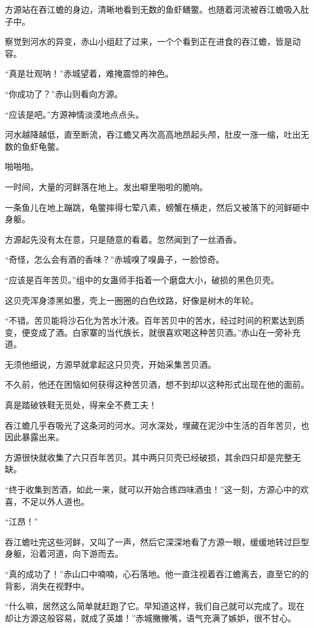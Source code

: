 \begin{this_body}
方源站在吞江蟾的身边，清晰地看到无数的鱼虾鳝鳖。也随着河流被吞江蟾吸入肚子中。

察觉到河水的异变，赤山小组赶了过来，一个个看到正在进食的吞江蟾，皆是动容。

“真是壮观呐！”赤城望着，难掩震惊的神色。

“你成功了？”赤山则看向方源。

“应该是吧。”方源神情淡漠地点点头。

河水越降越低，直至断流，吞江蟾又再次高高地昂起头颅，肚皮一涨一缩，吐出无数的鱼虾龟鳖。

啪啪啪。

一时间，大量的河鲜落在地上。发出噼里啪啦的脆响。

一条鱼儿在地上蹦跳，龟鳖摔得七荤八素，螃蟹在横走，然后又被落下的河鲜砸中身躯。

方源起先没有太在意，只是随意的看着。忽然闻到了一丝酒香。

“奇怪，怎么会有酒的香味？”赤城嗅了嗅鼻子，一脸惊奇。

“应该是百年苦贝。”组中的女蛊师手指着一个磨盘大小，破损的黑色贝壳。

这贝壳浑身漆黑如墨，壳上一圈圈的白色纹路，好像是树木的年轮。

“不错。苦贝能将沙石化为苦水汁液。百年苦贝中的苦水，经过时间的积累达到质变，便变成了酒。白家寨的当代族长，就很喜欢喝这种苦贝酒。”赤山在一旁补充道。

无须他细说，方源早就拿起这只贝壳，开始采集苦贝酒。

不久前，他还在困恼如何获得这种苦贝酒，想不到却以这种形式出现在他的面前。

真是踏破铁鞋无觅处，得来全不费工夫！

吞江蟾几乎吞吸光了这条河的河水。河水深处，埋藏在泥沙中生活的百年苦贝，也因此暴露出来。

方源很快就收集了六只百年苦贝。其中两只贝壳已经破损，其余四只却是完整无缺。

“终于收集到苦酒，如此一来，就可以开始合练四味酒虫！”这一刻，方源心中的欢喜，不足以外人道也。

“江昂！”

吞江蟾吐完这些河鲜，又叫了一声，然后它深深地看了方源一眼，缓缓地转过巨型身躯，沿着河道，向下游而去。

“真的成功了！”赤山口中喃喃，心石落地。他一直注视着吞江蟾离去，直至它的的背影，消失在视野中。

“什么嘛，居然这么简单就赶跑了它。早知道这样，我们自己就可以完成了。现在却让方源这般容易，就成了英雄！”赤城撇撇嘴，语气充满了嫉妒，很不甘心。


\end{this_body}
